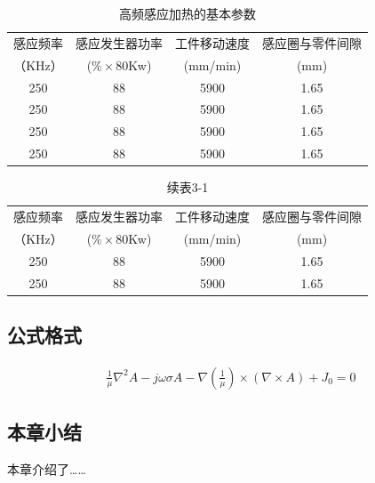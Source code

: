 \documentclass[UTF8,a4paper,12pt]{ctexart}
\numberwithin{equation}{section}
\begin{document}
\begin{table}[htbp]
\centering
\caption{高频感应加热的基本参数}
\begin{tabular}{c c c c}
\toprule
感应频率 &感应发生器功率 & 工件移动速度  &感应圈与零件间隙\\
（KHz）&($\% \times$80Kw) &(mm/min)  &(mm)\\
\midrule
250 &88 &5900 &1.65\\

250 &88 &5900 &1.65\\

250 &88 &5900 &1.65\\

250 &88 &5900 &1.65\\



\bottomrule
\end{tabular}
\end{table}

\begin{table}[htbp]
\centering
\captionsetup{singlelinecheck=off}
\caption*{续表3-1}
\begin{tabular}{c c c c}
\toprule
感应频率 &感应发生器功率 & 工件移动速度  &感应圈与零件间隙\\
（KHz）&($\% \times$80Kw) &(mm/min)  &(mm)\\
\midrule
250 &88 &5900 &1.65\\

250 &88 &5900 &1.65\\
\bottomrule
\end{tabular}
\end{table}


\subsection{公式格式}

\vspace{-10mm}
\begin{eqnarray}
\frac{1}{\mu} \nabla^2A - j \omega \sigma A -\nabla(\frac{1}{\mu}) \times(\nabla \times A)+J_0=0
\end{eqnarray}

\subsection{本章小结}
本章介绍了……

\newpage
{}
\end{document}
